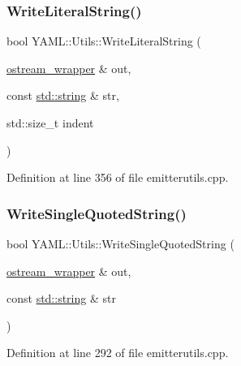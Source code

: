 \mbox{\label{namespace_y_a_m_l_1_1_utils_aeb118a00a60fa8cbbe613f787d8d2043}} 
\subsubsection{\texorpdfstring{WriteLiteralString()}{WriteLiteralString()}}
{\footnotesize\ttfamily bool Y\+A\+M\+L\+::\+Utils\+::\+Write\+Literal\+String (\begin{DoxyParamCaption}\item[{\mbox{\hyperlink{class_y_a_m_l_1_1ostream__wrapper}{ostream\+\_\+wrapper}} \&}]{out,  }\item[{const \mbox{\hyperlink{glad_8h_ac83513893df92266f79a515488701770}{std\+::string}} \&}]{str,  }\item[{std\+::size\+\_\+t}]{indent }\end{DoxyParamCaption})}



Definition at line 356 of file emitterutils.\+cpp.

\mbox{\label{namespace_y_a_m_l_1_1_utils_a891448c41049715579789fd852895422}} 
\subsubsection{\texorpdfstring{WriteSingleQuotedString()}{WriteSingleQuotedString()}}
{\footnotesize\ttfamily bool Y\+A\+M\+L\+::\+Utils\+::\+Write\+Single\+Quoted\+String (\begin{DoxyParamCaption}\item[{\mbox{\hyperlink{class_y_a_m_l_1_1ostream__wrapper}{ostream\+\_\+wrapper}} \&}]{out,  }\item[{const \mbox{\hyperlink{glad_8h_ac83513893df92266f79a515488701770}{std\+::string}} \&}]{str }\end{DoxyParamCaption})}



Definition at line 292 of file emitterutils.\+cpp.

\mbox{\label{namespace_y_a_m_l_1_1_utils_a7fde5352b7c504e255770937b71e9318}} 
